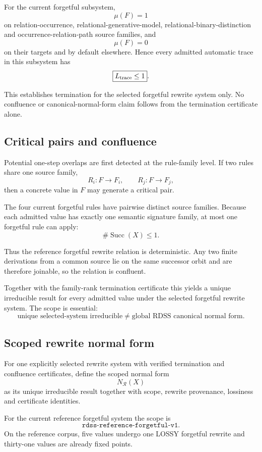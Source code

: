 \documentclass[11pt]{article}
\begin{document}
For the current forgetful subsystem,
\[
\mu(F)=1
\]
on relation-occurrence, relational-generative-model,
relational-binary-distinction and occurrence-relation-path source families,
and
\[
\mu(F)=0
\]
on their targets and by default elsewhere. Hence every admitted automatic
trace in this subsystem has
\[
\boxed{L_{\rm trace}\le 1}.
\]

This establishes termination for the selected forgetful rewrite system only.
No confluence or canonical-normal-form claim follows from the termination
certificate alone.

\subsection{Critical pairs and confluence}

Potential one-step overlaps are first detected at the rule-family level. If two
rules share one source family,
\[
R_i:F\to F_i,
\qquad
R_j:F\to F_j,
\]
then a concrete value in \(F\) may generate a critical pair.

The four current forgetful rules have pairwise distinct source families.
Because each admitted value has exactly one semantic signature family, at most
one forgetful rule can apply:
\[
\#\operatorname{Succ}(X)\le 1.
\]

Thus the reference forgetful rewrite relation is deterministic. Any two finite
derivations from a common source lie on the same successor orbit and are
therefore joinable, so the relation is confluent.

Together with the family-rank termination certificate this yields a unique
irreducible result for every admitted value under the selected forgetful
rewrite system. The scope is essential:
\[
\boxed{
\text{unique selected-system irreducible}
\neq
\text{global RDSS canonical normal form}.
}
\]

\subsection{Scoped rewrite normal form}

For one explicitly selected rewrite system with verified termination and
confluence certificates, define the scoped normal form
\[
N_{\mathcal R}(X)
\]
as its unique irreducible result together with scope, rewrite provenance,
lossiness and certificate identities.

For the current reference forgetful system the scope is
\[
\texttt{rdss-reference-forgetful-v1}.
\]
On the reference corpus, five values undergo one LOSSY forgetful rewrite and
thirty-one values are already fixed points.
\end{document}
